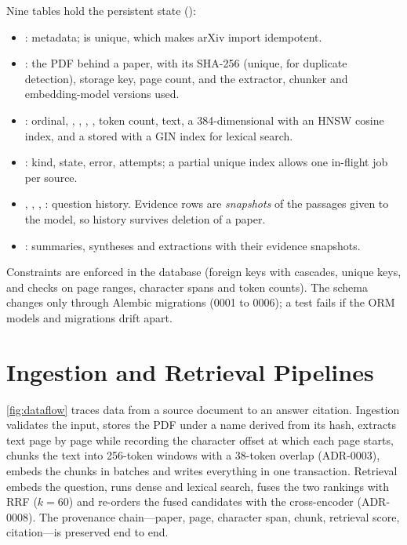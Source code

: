 Nine tables hold the persistent state ():
\begin{itemize}
  \item {}: metadata;  is unique, which makes arXiv import idempotent.
  \item {}: the PDF behind a paper, with its SHA-256 (unique, for duplicate detection), storage key,
        page count, and the extractor, chunker and embedding-model versions used.
  \item {}: ordinal, , , , , token
        count, text, a 384-dimensional  with an HNSW cosine index, and a stored  with a
        GIN index for lexical search.
  \item {}: kind, state, error, attempts; a partial unique index allows one in-flight job per
        source.
  \item {}, , , : question history.
        Evidence rows are \emph{snapshots} of the passages given to the model, so history survives deletion of a
        paper.
  \item {}: summaries, syntheses and extractions with their evidence snapshots.
\end{itemize}
Constraints are enforced in the database (foreign keys with cascades, unique keys, and checks on page ranges,
character spans and token counts). The schema changes only through Alembic migrations (0001 to 0006); a test
fails if the ORM models and migrations drift apart.

\section{Ingestion and Retrieval Pipelines}

\autoref{fig:dataflow} traces data from a source document to an answer citation. Ingestion validates the input,
stores the PDF under a name derived from its hash, extracts text page by page while recording the character
offset at which each page starts, chunks the text into 256-token windows with a 38-token overlap (ADR-0003),
embeds the chunks in batches and writes everything in one transaction. Retrieval embeds the question, runs dense
and lexical search, fuses the two rankings with RRF ($k=60$) and re-orders the fused candidates with the
cross-encoder (ADR-0008). The provenance chain---paper, page, character span, chunk, retrieval score, citation---is
preserved end to end.

